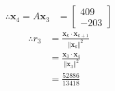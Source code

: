 \documentclass[12pt, a4paper]{scrartcl}
\begin{document}
\begin{enumerate}
\begin{enumerate}
\begin{align*}
                    \\ \therefore\textbf{x}_4 = A\textbf{x}_3 &= \begin{bmatrix}
                        409\\-203
                    \end{bmatrix}
                \end{align*}
                \begin{align*}
                    \therefore r_3&=\frac{\textbf{x}_k\cdot\textbf{x}_{k+1}}{\Vert\textbf{x}_k\Vert^2}
                    \\ &= \frac{\textbf{x}_3\cdot\textbf{x}_4}{\Vert\textbf{x}_3\Vert^2}
                    \\ &= \frac{52886}{13418}
                \end{align*}

            \end{enumerate}
        \end{enumerate}
\end{document}

